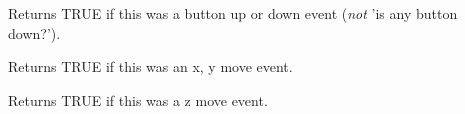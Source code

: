 
Returns TRUE if this was a button up or down event ({\it not} 'is any button down?').

\label{wxjoystickeventismove}


Returns TRUE if this was an x, y move event.

\label{wxjoystickeventiszmove}


Returns TRUE if this was a z move event.

